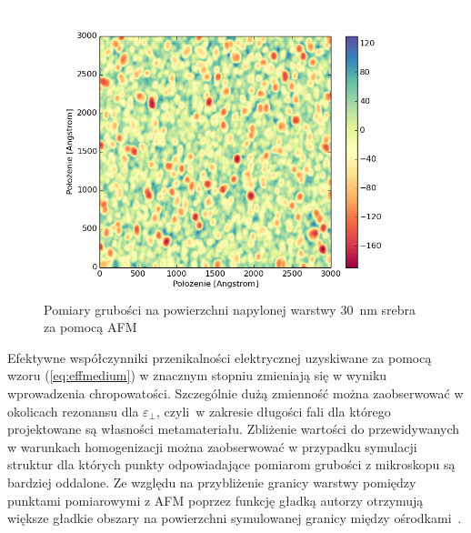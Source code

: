 \begin{figure}[bt]
		\includegraphics[width=\textwidth]{images/multilayer/ag30nm-afm-measure.png}
		\caption{Pomiary grubości na powierzchni napylonej warstwy $30$~nm srebra za pomocą AFM} 
		\label{fig:ag30nm-afmmeasure}
\end{figure}


Efektywne współczynniki przenikalności elektrycznej uzyskiwane za pomocą wzoru (\ref{eq:effmedium}) w znacznym stopniu zmieniają się w wyniku wprowadzenia chropowatości. Szczególnie dużą zmienność można zaobserwować w okolicach rezonansu dla $\varepsilon_{\perp}$, czyli~w zakresie długości fali dla którego projektowane są własności metamateriału. Zbliżenie wartości do przewidywanych w warunkach homogenizacji można zaobserwować w przypadku symulacji struktur dla których punkty odpowiadające pomiarom grubości z mikroskopu są bardziej oddalone. Ze względu na przybliżenie granicy warstwy pomiędzy punktami pomiarowymi z AFM poprzez funkcję gładką autorzy otrzymują większe gładkie obszary na powierzchni symulowanej granicy między ośrodkami~\cite{ludwig2012impact}. 

